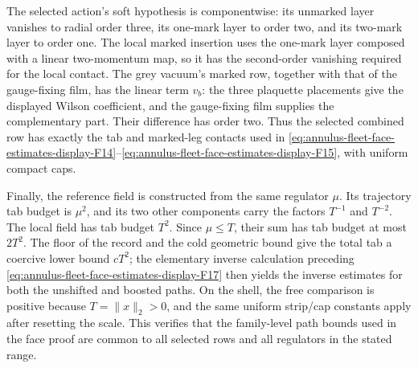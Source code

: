 The selected action's soft hypothesis is componentwise: its unmarked
layer vanishes to radial order three, its one-mark layer to order two,
and its two-mark layer to order one. The local marked insertion uses the
one-mark layer composed with a linear two-momentum map, so it has the
second-order vanishing required for the local contact. The grey vacuum's
marked row, together with that of the gauge-fixing film, has the linear
term $v_b$: the three plaquette placements give the displayed Wilson
coefficient, and the gauge-fixing film supplies the complementary
part.
Their difference has order two. Thus the selected combined row has
exactly the tab and marked-leg contacts used in \eqref{eq:annulus-fleet-face-estimates-display-F14}--\eqref{eq:annulus-fleet-face-estimates-display-F15}, with
uniform compact caps.

Finally, the reference field is constructed from the same regulator
$\mu$. Its trajectory tab budget is $\mu^2$, and its two other
components carry the factors $T^{-1}$ and $T^{-2}$. The local field has
tab budget $T^2$. Since $\mu\leq T$, their sum has tab budget at most
$2T^2$. The floor of the record and the cold geometric bound give the
total tab a coercive lower bound $cT^2$; the elementary inverse
calculation preceding \eqref{eq:annulus-fleet-face-estimates-display-F17} then yields the inverse estimates for both
the unshifted and boosted paths. On the shell, the free comparison is
positive because $T=\|x\|_2>0$, and the same uniform strip/cap constants
apply after resetting the scale. This verifies that the family-level
path bounds used in the face proof are common to all selected rows and
all regulators in the stated range.
